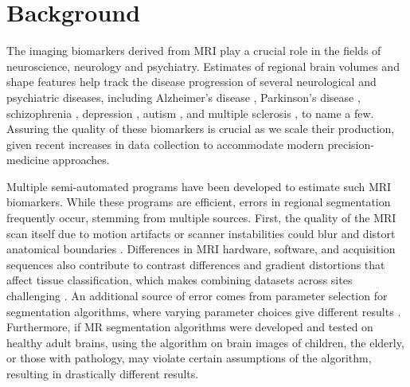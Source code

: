 \section{Background}


The imaging biomarkers derived from MRI play a crucial role in the fields of neuroscience, neurology and psychiatry. Estimates of regional brain volumes and shape features help track the disease progression of several neurological and psychiatric diseases, including Alzheimer's disease \cite{18632739,Vemuri_2010}, Parkinson's disease \cite{Silvia_Mangia_2013}, schizophrenia \cite{shenton2001review}, depression \cite{meisenzahl2011structural}, autism \cite{brambilla2003brain}, and multiple sclerosis \cite{Filippi_1995}, to name a few. Assuring the quality of these biomarkers is crucial as we scale their production, given recent increases in data collection to accommodate modern precision-medicine approaches. 

Multiple semi-automated programs have been developed to estimate such MRI biomarkers. While these programs are efficient, errors in regional segmentation frequently occur, stemming from multiple sources. First, the quality of the MRI scan itself due to motion artifacts or scanner instabilities could blur and distort anatomical boundaries \cite{Blumenthal_2002,Reuter_2015,Savalia_2016}. Differences in MRI hardware, software, and acquisition sequences also contribute to contrast differences and gradient distortions that affect tissue classification, which makes combining datasets across sites challenging \cite{keshavan2016power}. An additional source of error comes from parameter selection for segmentation algorithms, where varying parameter choices give different results \cite{Han_2006}. Furthermore, if MR segmentation algorithms were developed and tested on healthy adult brains, using the algorithm on brain images of children, the elderly, or those with pathology, may violate certain assumptions of the algorithm, resulting in drastically different results. 

